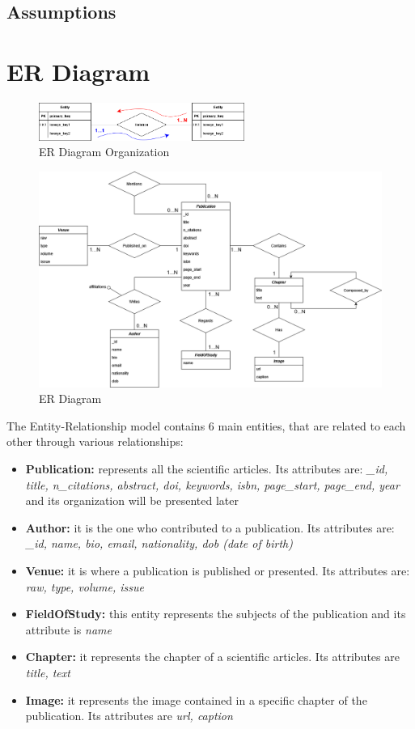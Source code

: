 \documentclass{Configuration_Files/PoliMi3i_thesis}
\begin{document}
\section{Assumptions}


\chapter{ER Diagram}
\label{ch:erd}
\begin{figure}[H]
	\centering
	\includegraphics[width=0.6\textwidth]{legendaER.png}
	\caption{ER Diagram Organization}
	\label{fig:erleg}
\end{figure}
\bigskip
\begin{figure}[H]
	\centering
	\includegraphics[width=1\textwidth]{ERDocDb.png}
	\caption{ER Diagram}
	\label{fig:er}
\end{figure}
\newpage

The Entity-Relationship model contains 6 main entities, that are related to each other through various relationships:
\begin{itemize}
	\item \textbf{Publication:} represents all the scientific articles. Its attributes are: \emph{\_id, title, n\_citations,
		abstract, doi, keywords, isbn, page\_start, page\_end, year} and its organization will be presented later
	\item \textbf{Author:} it is the one who contributed to a publication. Its attributes are: \emph{\_id, name, bio,
		email, nationality, dob (date of birth)}
	\item \textbf{Venue:} it is where a publication is published or presented. Its attributes are: \emph{raw, type,
		volume, issue}
	\item \textbf{FieldOfStudy:} this entity represents the subjects of the publication and its attribute is \emph{name}
	\item \textbf{Chapter:} it represents the chapter of a scientific articles. Its attributes are \emph{title, text}
	\item \textbf{Image:} it represents the image contained in a specific chapter of the publication. Its attributes are
		\emph{url, caption}
\end{itemize}
\end{document}
